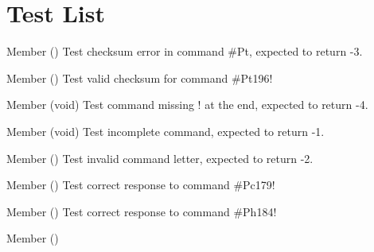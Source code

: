 \chapter{Test List}
\hypertarget{test}{}\label{test}

\begin{DoxyRefList}
\item[Member \doxylink{test_8c_a24c86721354d3e133166708120d06011}{test\+\_\+cmd\+Processor\+\_\+checksum\+\_\+errado\+\_\+entrada} ()]\label{test__test000011}%
%
Test checksum error in command \#\+Pt, expected to return -\/3.  
\item[Member \doxylink{test_8c_a7b127ce1adde2bec898a4fe46d7db7c1}{test\+\_\+cmd\+Processor\+\_\+checksum\+\_\+valido\+\_\+entrada} ()]\label{test__test000012}%
%
Test valid checksum for command \#\+Pt196!  
\item[Member \doxylink{test_8c_a2dfde4b95e2728cf4dbe25db4b520b05}{test\+\_\+cmd\+Processor\+\_\+faltando\+\_\+ultimo\+\_\+caractere} (void)]\label{test__test000010}%
%
Test command missing \textquotesingle{}!\textquotesingle{} at the end, expected to return -\/4.  
\item[Member \doxylink{test_8c_adeccaed3699ec8e363ca7bc03dd02b82}{test\+\_\+cmd\+Processor\+\_\+incompleto} (void)]\label{test__test000008}%
%
Test incomplete command, expected to return -\/1.  
\item[Member \doxylink{test_8c_aa072179016f82cfd48b5176724c77a32}{test\+\_\+cmd\+Processor\+\_\+letra\+\_\+comando\+\_\+invalido} ()]\label{test__test000009}%
%
Test invalid command letter, expected to return -\/2.  
\item[Member \doxylink{test_8c_a266d7d18f237f2e965dcb5b7190fcbe7}{test\+\_\+cmd\+Processor\+\_\+\+Pc\+\_\+verificar\+\_\+resposta\+\_\+correta} ()]\label{test__test000019}%
%
Test correct response to command \#\+Pc179!  
\item[Member \doxylink{test_8c_ab365b1bdeb689de1835c0a8cf0db2c62}{test\+\_\+cmd\+Processor\+\_\+\+Ph\+\_\+verificar\+\_\+resposta\+\_\+correta} ()]\label{test__test000018}%
%
Test correct response to command \#\+Ph184!  
\item[Member \doxylink{test_8c_a0573609194137892a9aef74aed34a6f3}{test\+\_\+cmd\+Processor\+\_\+\+Pt\+\_\+verificar\+\_\+resposta\+\_\+correta} ()]\label{test__test000017}%

\end{DoxyRefList}
